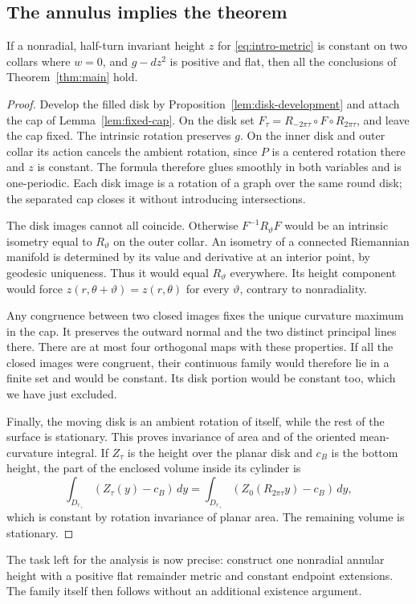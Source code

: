 \subsection{The annulus implies the theorem}

\begin{theorem}\label{thm:geometric-closure}
If a nonradial, half-turn invariant height $z$ for
\eqref{eq:intro-metric} is constant on two collars where $w=0$, and
$g-dz^2$ is positive and flat, then all the conclusions of
Theorem~\ref{thm:main} hold.
\end{theorem}

\begin{proof}
Develop the filled disk by Proposition~\ref{lem:disk-development}
and attach the cap of Lemma~\ref{lem:fixed-cap}. On the disk set
$F_\tau=R_{-2\pi\tau}\circ F\circ R_{2\pi\tau}$, and leave the
cap fixed. The intrinsic rotation preserves $g$. On the inner disk
and outer collar its action cancels the ambient rotation, since
$P$ is a centered rotation there and $z$ is constant. The formula
therefore glues smoothly in both variables and is one-periodic.
Each disk image is a rotation of a graph over the same round disk;
the separated cap closes it without introducing intersections.

The disk images cannot all coincide. Otherwise
$F^{-1}R_\vartheta F$ would be an intrinsic isometry equal to
$R_\vartheta$ on the outer collar. An isometry of a connected
Riemannian manifold is determined by its value and derivative at an
interior point, by geodesic uniqueness. Thus it would equal
$R_\vartheta$ everywhere. Its height component would force
$z(r,\theta+\vartheta)=z(r,\theta)$ for every $\vartheta$, contrary
to nonradiality.

Any congruence between two closed images fixes the unique curvature
maximum in the cap. It preserves the outward normal and the two
distinct principal lines there. There are at most four orthogonal
maps with these properties. If all the closed images were congruent,
their continuous family would therefore lie in a finite set and
would be constant. Its disk portion would be constant too, which
we have just excluded.

Finally, the moving disk is an ambient rotation of itself, while
the rest of the surface is stationary. This proves invariance of
area and of the oriented mean-curvature integral. If $Z_\tau$ is
the height over the planar disk and $c_B$ is the bottom height, the
part of the enclosed volume inside its cylinder is
\[
 \int_{D_{r_+}}(Z_\tau(y)-c_B)\,dy
 =\int_{D_{r_+}}(Z_0(R_{2\pi\tau}y)-c_B)\,dy,
\]
which is constant by rotation invariance of planar area. The
remaining volume is stationary.
\end{proof}

The task left for the analysis is now precise: construct one
nonradial annular height with a positive flat remainder metric and
constant endpoint extensions. The family itself then follows
without an additional existence argument.
